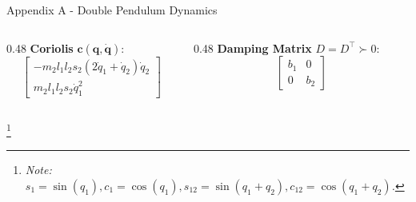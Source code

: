 \begin{frame}{Appendix A - Double Pendulum Dynamics}
    \begin{columns}[T]
        \begin{column}{0.48\textwidth}
            \textbf{Coriolis} $\mathbf{c}(\mathbf{q}, \dot{\mathbf{q}})$:
            \begin{equation*}
                \begin{bmatrix}
                    -m_2 l_1 l_2 s_2 (2 \dot{q}_1 + \dot{q}_2) \dot{q}_2 \\
                    m_2 l_1 l_2 s_2 \dot{q}_1^2
                \end{bmatrix}
            \end{equation*}
        \end{column}
        \begin{column}{0.48\textwidth}
            \textbf{Damping Matrix} $D = D^\top \succ 0$:
            \begin{equation*}
                \begin{bmatrix}
                    b_1 & 0 \\
                    0 & b_2
                \end{bmatrix}
            \end{equation*}
        \end{column}
    \end{columns}
    \let\thefootnote\relax\footnote{\textit{Note: $s_1 = \sin(q_1), c_1 = \cos(q_1), s_{12} = \sin(q_1+q_2), c_{12} = \cos(q_1+q_2)$.}}
\end{frame}
